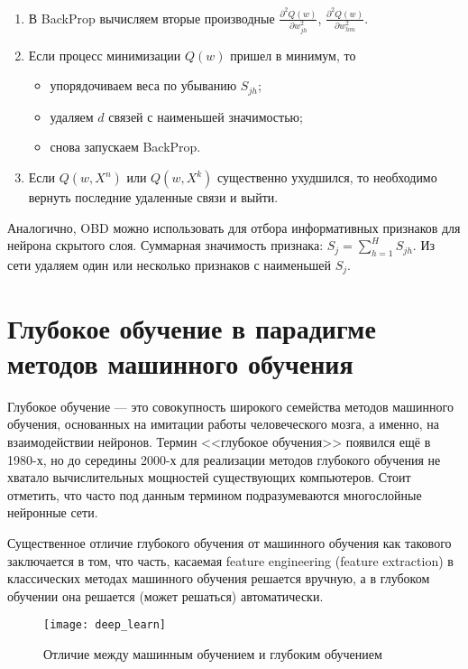 \documentclass{article}
\begin{document}
	\begin{enumerate}
		\item В BackProp вычисляем вторые производные $\frac{\partial^2 Q(w) }{\partial w_{jh}^2 } $,  $\frac{\partial^2 Q(w) }{\partial w_{hm}^2 } $.
		\item Если процесс минимизации $Q(w)$ пришел в минимум, то
		\begin{itemize}
			\item упорядочиваем веса по убыванию $S_{jh}$;
			\item удаляем $d$ связей с наименьшей значимостью;
			\item снова запускаем BackProp.
		\end{itemize}
		\item Если $Q(w, X^n)$ или $Q(w, X^k)$ существенно ухудшился, то необходимо вернуть последние удаленные связи и выйти.
	\end{enumerate}
	
	Аналогично, OBD можно использовать для отбора информативных признаков для нейрона скрытого слоя.
	Суммарная значимость признака: $S_j = \sum_{h=1}^{H} S_{jh}$. Из сети удаляем один или несколько признаков с наименьшей $S_j$.
	
	\section{Глубокое обучение в парадигме методов машинного обучения}
	
	Глубокое обучение --- это совокупность широкого семейства методов машинного обучения, основанных на имитации работы человеческого мозга, а именно, на взаимодействии нейронов. Термин <<глубокое обучения>> появился ещё в 1980-х, но до середины 2000-х для реализации методов глубокого обучения не хватало вычислительных мощностей существующих компьютеров. Стоит отметить, что часто под данным термином подразумеваются многослойные нейронные сети.
	
	
	Существенное отличие глубокого обучения от машинного обучения как такового заключается в том, что часть, касаемая feature engineering (feature extraction) в классических методах машинного обучения решается вручную, а в глубоком обучении она решается (может решаться) автоматически.
	
	\begin{figure}[H]
		\begin{center}
			\texttt{[image: deep\_learn]}
		\end{center}
		\caption{Отличие между машинным обучением и глубоким обучением}
	\end{figure}
	
\end{document}
